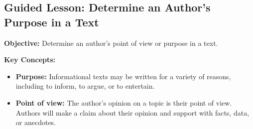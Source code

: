 \documentclass[12pt]{article}
\begin{document}
\subsection*{Guided Lesson: Determine an Author's Purpose in a Text}
\onehalfspacing

\begin{tcolorbox}[colframe=black!40, colback=gray!5, 
coltitle=black, colbacktitle=black!20, fonttitle=\bfseries\Large, 
title=Learning Objective, halign title=center, left=5pt, right=5pt, top=5pt, bottom=15pt]
\textbf{Objective:} Determine an author's point of view or purpose in a text.
\end{tcolorbox}

\vspace{1em}

\begin{tcolorbox}[colframe=black!60, colback=white, 
coltitle=black, colbacktitle=black!15, fonttitle=\bfseries\Large, 
title=Key Concepts and Vocabulary, halign title=center, left=10pt, right=10pt, top=10pt, bottom=15pt]
\textbf{Key Concepts:}
\begin{itemize}
\item \textbf{Purpose:} Informational texts may be written for a variety of reasons, including to inform, to argue, or to entertain.
    \item \textbf{Point of view:} The author's opinion on a topic is their point of view. Authors will make a claim about their opinion and support with facts, data, or anecdotes.



\end{itemize}
\end{tcolorbox}

\vspace{8cm}
\end{document}
